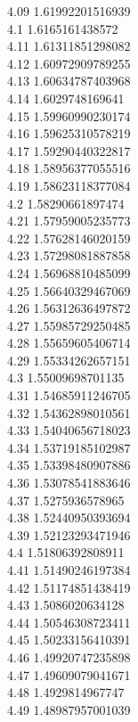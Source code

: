 {4.09	1.61992201516939\\
4.1	1.6165161438572\\
4.11	1.61311851298082\\
4.12	1.60972909789255\\
4.13	1.60634787403968\\
4.14	1.6029748169641\\
4.15	1.59960990230174\\
4.16	1.59625310578219\\
4.17	1.59290440322817\\
4.18	1.58956377055516\\
4.19	1.58623118377084\\
4.2	1.58290661897474\\
4.21	1.57959005235773\\
4.22	1.57628146020159\\
4.23	1.57298081887858\\
4.24	1.56968810485099\\
4.25	1.56640329467069\\
4.26	1.56312636497872\\
4.27	1.55985729250485\\
4.28	1.55659605406714\\
4.29	1.55334262657151\\
4.3	1.55009698701135\\
4.31	1.54685911246705\\
4.32	1.54362898010561\\
4.33	1.54040656718023\\
4.34	1.53719185102987\\
4.35	1.53398480907886\\
4.36	1.53078541883646\\
4.37	1.5275936578965\\
4.38	1.52440950393694\\
4.39	1.52123293471946\\
4.4	1.51806392808911\\
4.41	1.51490246197384\\
4.42	1.51174851438419\\
4.43	1.5086020634128\\
4.44	1.50546308723411\\
4.45	1.50233156410391\\
4.46	1.49920747235898\\
4.47	1.49609079041671\\
4.48	1.4929814967747\\
4.49	1.48987957001039\\
}
